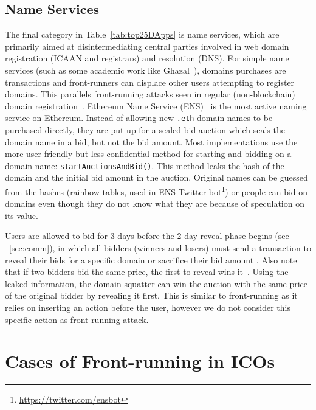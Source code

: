 
\subsection{Name Services}\label{sec:ens}

The final category in Table~\ref{tab:top25DApps} is name services, which are primarily aimed at disintermediating central parties involved in web domain registration (\eg ICAAN and registrars) and resolution (\eg DNS). For simple name services (such as some academic work like Ghazal~\cite{moosavi2019ghazal}), domains purchases are transactions and front-runners can displace other users attempting to register domains. This parallels front-running attacks seen in regular (non-blockchain) domain registration~\cite{sac022en33:online}. \textsf{Ethereum Name Service (ENS)}~\cite{ensEIP} is the most active naming service on Ethereum. Instead of allowing new \texttt{.eth} domain names to be purchased directly, they are put up for a sealed bid auction which seals the domain name in a bid, but not the bid amount. Most implementations use the more user friendly but less confidential method for starting and bidding on a domain name: \texttt{startAuctionsAndBid()}. This method leaks the hash of the domain and the initial bid amount in the auction. Original names can be guessed from the hashes (\eg rainbow tables, used in ENS Twitter bot\footnote{\url{https://twitter.com/ensbot}}) or people can bid on domains even though they do not know what they are because of speculation on its value. 

Users are allowed to bid for 3 days before the 2-day reveal phase begins (see ~\ref{sec:comm}), in which all bidders (winners and losers) must send a transaction to reveal their bids for a specific domain or sacrifice their bid amount . Also note that if two bidders bid the same price, the first to reveal wins it~\cite{ENSHandlingFrontRunningDiscussion}. Using the leaked information, the domain squatter can win the auction with the same price of the original bidder by revealing it first. This is similar to front-running as it relies on inserting an action before the user, however we do not consider this specific action as front-running attack. 



\section{Cases of Front-running in ICOs}  \label{sec:ICOsfrontrunning}

